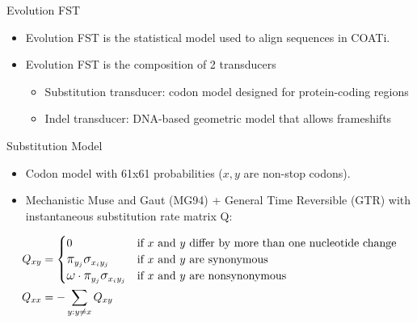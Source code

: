 \documentclass[aspectratio=169,font=14pt]{beamer}
\newcommand{\grande}[1]{\mathlarger{\mathlarger{#1}}}
\begin{document}
\begin{frame}{Evolution FST} %
\begin{itemize}
    \item Evolution FST is the statistical model used to align sequences in COATi.
    \item Evolution FST is the composition of 2 transducers
    \vspace{1em}
    \begin{itemize}
        \setlength\itemsep{2em}
        \item Substitution transducer: codon model designed for protein-coding regions
        \item Indel transducer: DNA-based geometric model that allows frameshifts
    \end{itemize}
\end{itemize}
\end{frame} %

\begin{frame}[t]{Substitution Model} %
\begin{itemize}
    \item Codon model with 61x61 probabilities ($x, y$ are  non-stop codons).
    \item Mechanistic Muse and Gaut (MG94) + General Time Reversible (GTR) with instantaneous substitution rate matrix Q:
\end{itemize}
    \begin{align*}
    Q_{xy} &=  \begin{cases}
        0 & \text{if $x$ and $y$ differ by more than one nucleotide change}\\
        \grande{\pi}_{y_j}\grande{\sigma}_{x_iy_j} & \text{if $x$ and $y$ are synonymous}\\
        \grande{\omega} \cdot \grande{\pi}_{y_j} \grande{\sigma}_{x_iy_j} & \text{if $x$ and $y$ are nonsynonymous}
    \end{cases}\\
    Q_{xx} &= -\sum_{y:y \neq x} Q_{xy}
    \end{align*}
\end{frame} %
\end{document}
